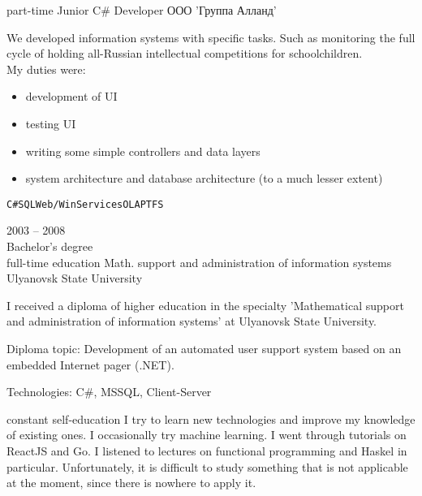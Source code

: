 \begin{entrylist}
{		\footnotesize{part-time}}
		{Junior C\# Developer}
		{ООО 'Группа Алланд'}
		{We developed information systems with specific tasks. Such as monitoring the full cycle of holding all-Russian intellectual competitions for schoolchildren.\\
    My duties were:
    \begin{itemize}
      \item development of UI
      \item testing UI
      \item writing some simple controllers and data layers
      \item system architecture and database architecture (to a much lesser extent)
    \end{itemize}

		\texttt{C\#}\slashsep\texttt{SQL}\slashsep\texttt{Web/WinServices}\slashsep\texttt{OLAP}\slashsep\texttt{TFS}}

\end{entrylist}




\begin{entrylist}
	\entry
		{2003 -- 2008\\\footnotesize{Bachelor's degree\\full-time education}}
		{Math. support and administration of information systems}
		{Ulyanovsk State University}
		{I received a diploma of higher education in the specialty 'Mathematical support and administration of information systems' at Ulyanovsk State University.

    Diploma topic: Development of an automated user support system based on an embedded Internet pager (.NET).

    Technologies: C\#, MSSQL, Client-Server
		}
	\entry
		{constant}
		{self-education}
		{}
		{I try to learn new technologies and improve my knowledge of existing ones. I occasionally try machine learning. I went through tutorials on ReactJS and Go. I listened to lectures on functional programming and Haskel in particular. Unfortunately, it is difficult to study something that is not applicable at the moment, since there is nowhere to apply it.}
\end{entrylist}


